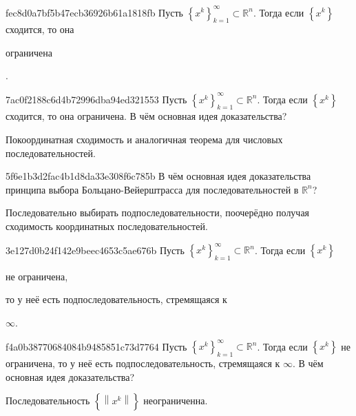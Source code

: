 \begin{note}{fec8d0a7bf5b47ecb36926b61a1818fb}
    Пусть \({ \left\{ x^{k} \right\}_{k = 1}^{\infty} \subset \mathbb R^{n} }\).
    Тогда если \({ \left\{ x^{k} \right\} }\) сходится, то она \begin{icloze}{1}ограничена\end{icloze}.
\end{note}

\begin{note}{7ac0f2188c6d4b72996dba94ed321553}
    Пусть \({ \left\{ x^{k} \right\}_{k = 1}^{\infty} \subset \mathbb R^{n} }\).
    Тогда если \({ \left\{ x^{k} \right\} }\) сходится, то она ограничена.
    В чём основная идея доказательства?

    \begin{cloze}{1}
        Покоординатная сходимость и аналогичная теорема для числовых последовательностей.
    \end{cloze}
\end{note}

\begin{note}{5f6e1b3d2fac4b1d8da33e308f6c785b}
    В чём основная идея доказательства принципа выбора Боль\-ца\-но-Вейерштрасса для последовательностей в \({ \mathbb R^{n} }\)?

    \begin{cloze}{1}
        Последовательно выбирать подпоследовательности, поочерёдно получая сходимость координатных последовательностей.
    \end{cloze}
\end{note}

\begin{note}{3e127d0b24f142e9beec4653c5ae676b}
    Пусть \({ \left\{ x^{k} \right\}_{k = 1}^{\infty} \subset \mathbb R^{n} }\).
    Тогда если \({ \left\{ x^{k} \right\} }\) \begin{icloze}{2}не ограничена,\end{icloze} то у неё есть подпоследовательность, стремящаяся к \begin{icloze}{1}\({ \infty }\).\end{icloze}
\end{note}

\begin{note}{f4a0b38770684084b9485851c73d7764}
    Пусть \({ \left\{ x^{k} \right\}_{k = 1}^{\infty} \subset \mathbb R^{n} }\).
    Тогда если \({ \left\{ x^{k} \right\} }\) не ограничена, то у неё есть подпоследовательность, стремящаяся к \({ \infty }\).
    В чём основная идея доказательства?

    \begin{cloze}{1}
        Последовательность \({ \left\{ \left\lVert x^{k} \right\rVert \right\} }\) неограниченна.
    \end{cloze}
\end{note}



